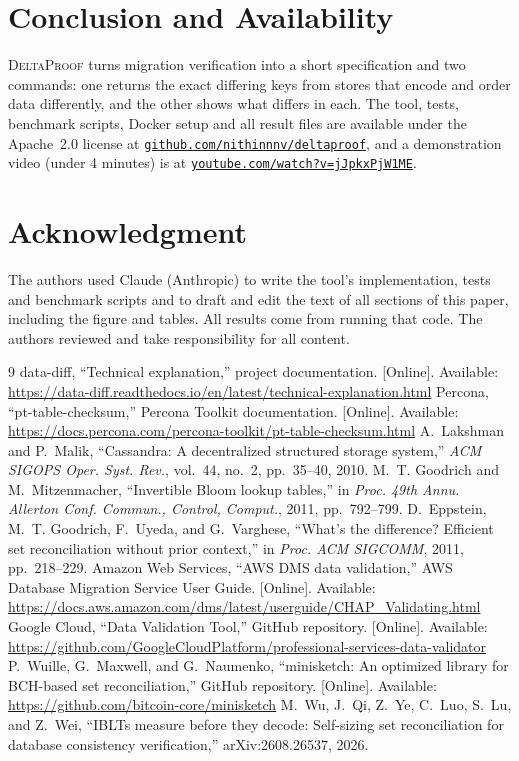 \documentclass[conference]{IEEEtran}
\newcommand{\sys}{\textsc{DeltaProof}}
\newcommand{\repo}{\href{https://github.com/nithinnnv/deltaproof}{\mbox{\texttt{github.com/nithinnnv/deltaproof}}}}
\newcommand{\video}{\href{https://www.youtube.com/watch?v=jJpkxPjW1ME}{\mbox{\texttt{youtube.com/watch?v=jJpkxPjW1ME}}}}
\begin{document}
\section{Conclusion and Availability}
\sys{} turns migration verification into a short specification and two commands: one returns the exact differing keys from stores that encode and order data differently, and the other shows what differs in each. The tool, tests, benchmark scripts, Docker setup and all result files are available under the Apache~2.0 license at \repo{}, and a demonstration video (under 4 minutes) is at \video{}.

\section*{Acknowledgment}
The authors used Claude (Anthropic) to write the tool's implementation, tests and benchmark scripts and to draft and edit the text of all sections of this paper, including the figure and tables. All results come from running that code. The authors reviewed and take responsibility for all content.

\begin{thebibliography}{9}
 data-diff, ``Technical explanation,'' project documentation. [Online]. Available: \url{https://data-diff.readthedocs.io/en/latest/technical-explanation.html}
 Percona, ``pt-table-checksum,'' Percona Toolkit documentation. [Online]. Available: \url{https://docs.percona.com/percona-toolkit/pt-table-checksum.html}
 A.~Lakshman and P.~Malik, ``Cassandra: A decentralized structured storage system,'' \emph{ACM SIGOPS Oper. Syst. Rev.}, vol.~44, no.~2, pp.~35--40, 2010.
 M.~T. Goodrich and M.~Mitzenmacher, ``Invertible Bloom lookup tables,'' in \emph{Proc. 49th Annu. Allerton Conf. Commun., Control, Comput.}, 2011, pp.~792--799.
 D.~Eppstein, M.~T. Goodrich, F.~Uyeda, and G.~Varghese, ``What's the difference? Efficient set reconciliation without prior context,'' in \emph{Proc. ACM SIGCOMM}, 2011, pp.~218--229.
 Amazon Web Services, ``AWS DMS data validation,'' AWS Database Migration Service User Guide. [Online]. Available: \url{https://docs.aws.amazon.com/dms/latest/userguide/CHAP_Validating.html}
 Google Cloud, ``Data Validation Tool,'' GitHub repository. [Online]. Available: \url{https://github.com/GoogleCloudPlatform/professional-services-data-validator}
 P.~Wuille, G.~Maxwell, and G.~Naumenko, ``minisketch: An optimized library for BCH-based set reconciliation,'' GitHub repository. [Online]. Available: \url{https://github.com/bitcoin-core/minisketch}
 M.~Wu, J.~Qi, Z.~Ye, C.~Luo, S.~Lu, and Z.~Wei, ``IBLTs measure before they decode: Self-sizing set reconciliation for database consistency verification,'' arXiv:2608.26537, 2026.
\end{thebibliography}
\end{document}

